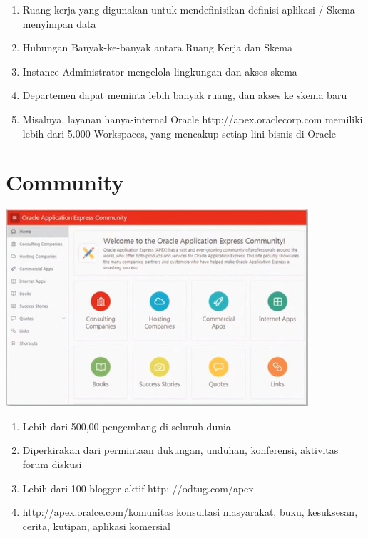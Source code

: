 \documentclass{article}
\begin{document}
\begin{enumerate}
    \item Ruang kerja yang digunakan untuk mendefinisikan definisi aplikasi / Skema menyimpan data
    \item Hubungan Banyak-ke-banyak antara Ruang Kerja dan Skema
    \item Instance Administrator mengelola lingkungan dan akses skema
    \item Departemen dapat meminta lebih banyak ruang, dan akses ke skema baru
    \item Misalnya, layanan hanya-internal Oracle http://apex.oraclecorp.com memiliki lebih dari 5.000 Workspaces, yang mencakup setiap lini bisnis di Oracle

\end{enumerate}
\section{Community}
\begin{center}
    \includegraphics[width=10cm\textwidth]{gambar/Community.jpg}
\end{center}
\begin{enumerate}
    \item Lebih dari 500,00 pengembang di seluruh dunia
    \item Diperkirakan dari permintaan dukungan, unduhan, konferensi, aktivitas forum diskusi
    \item Lebih dari 100 blogger aktif http: //odtug.com/apex
    \item http://apex.oralce.com/komunitas konsultasi masyarakat, buku, kesuksesan, cerita, kutipan, aplikasi komersial

\end{enumerate}

\usepackage{Apakah Anda Seorang Siswa Atau Guru SQL, Database Relasional, atau Pengembangan Aplikasi, Anda Dapat Menggunakan Oracle Apex Untuk Sangat Memperkaya Pengalaman Pendidikan Anda?}
\end{document}
